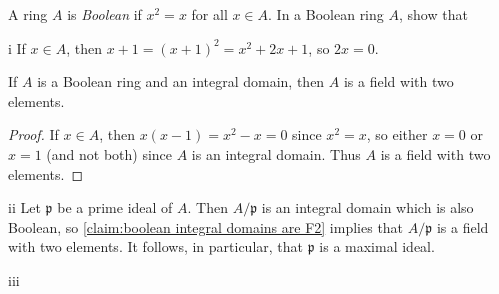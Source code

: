 \begin{exercise}
A ring \(A\) is \emph{Boolean} if \(x^2 = x\) for all \(x \in A\).
In a Boolean ring \(A\), show that
\end{exercise}

\begin{partsolution}{i}
If \(x \in A\), then \(x + 1 = \left(x + 1\right)^2 = x^2 + 2 x + 1\), so \(2 x = 0\).
\end{partsolution}

\begin{claim}
\label{claim:boolean integral domains are F2}
If \(A\) is a Boolean ring and an integral domain, then \(A\) is a field with two elements.
\end{claim}

\begin{proof}
If \(x \in A\), then \(x(x - 1) = x^2 - x = 0\) since \(x^2 = x\), so either \(x = 0\) or \(x = 1\) (and not both) since \(A\) is an integral domain.
Thus \(A\) is a field with two elements.
\end{proof}

\begin{partsolution}{ii}
Let \(\mathfrak{p}\) be a prime ideal of \(A\).
Then \(A / \mathfrak{p}\) is an integral domain which is also Boolean, so \autoref{claim:boolean integral domains are F2} implies that \(A / \mathfrak{p}\) is a field with two elements.
It follows, in particular, that \(\mathfrak{p}\) is a maximal ideal.
\end{partsolution}

\begin{partsolution}{iii}

\end{partsolution}